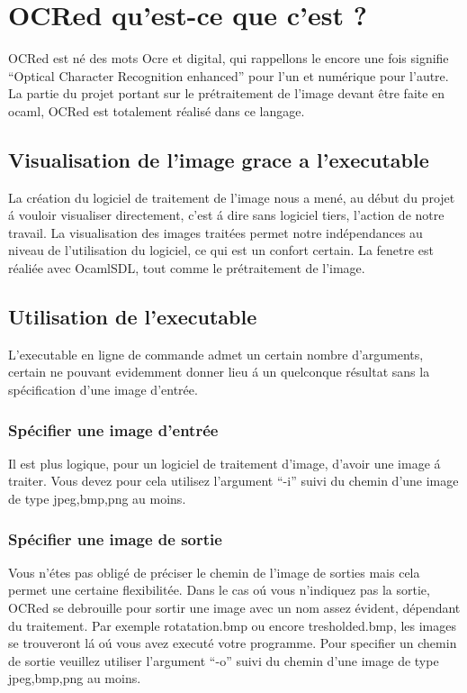 \chapter{ OCRed qu'est-ce que c'est ? }
 OCRed est n\'e des mots Ocre et digital, qui rappellons le encore une fois
 signifie ``Optical Character Recognition enhanced'' pour l'un et
 num\'erique pour l'autre. La partie du projet portant sur le
 pr\'etraitement de l'image devant \^etre faite en ocaml, OCRed est
 totalement r\'ealis\'e dans ce langage.
\section{ Visualisation de l'image grace a l'executable }
 La cr\'eation du logiciel de traitement de l'image nous a men\'e, au
 d\'ebut du projet \'a vouloir visualiser directement, c'est \'a dire
 sans logiciel tiers, l'action de notre travail.
 La visualisation des images trait\'ees permet notre ind\'ependances
 au niveau de l'utilisation du logiciel, ce qui est un confort certain.
 La fenetre est r\'eali\'ee avec OcamlSDL, tout comme le pr\'etraitement
 de l'image.
\section{ Utilisation de l'executable }
 L'executable en ligne de commande admet un certain nombre d'arguments,
 certain ne pouvant evidemment donner lieu \'a un quelconque r\'esultat
 sans la sp\'ecification d'une image d'entr\'ee.
\subsection{ Sp\'ecifier une image d'entr\'ee }
 Il est plus logique, pour un logiciel de traitement d'image, d'avoir
 une image \'a traiter. Vous devez pour cela utilisez l'argument ``-i''
 suivi du chemin d'une image de type jpeg,bmp,png au moins.
\subsection{ Sp\'ecifier une image de sortie }
 Vous n'\'etes pas oblig\'e de pr\'eciser le chemin de l'image de sorties
 mais cela permet une certaine flexibilit\'ee. Dans le cas o\'u vous
 n'indiquez pas la sortie, OCRed se debrouille pour sortir une image
 avec un nom assez \'evident, d\'ependant du traitement. Par exemple
 rotatation.bmp ou encore tresholded.bmp, les images se trouveront l\'a
 o\'u vous avez execut\'e votre programme. Pour specifier un chemin de
 sortie veuillez utiliser l'argument ``-o'' suivi du chemin d'une image
de type jpeg,bmp,png au moins.
